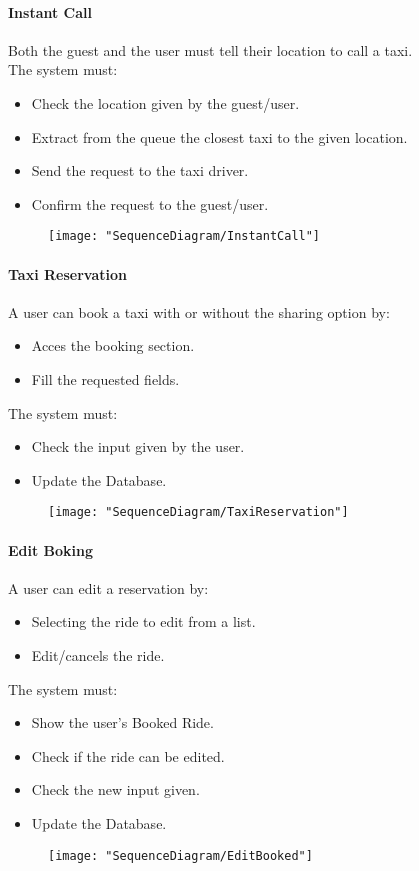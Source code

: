 		\paragraph{Instant Call}
			Both the guest and the user must tell their location to call a taxi.\\
			The system must:\begin{itemize}
				\item Check the location given by the guest/user.
				\item Extract from the queue the closest taxi to the given location.
				\item Send the request to the taxi driver.
				\item Confirm the request to the guest/user.
			\end{itemize}
			\begin{figure}[h!]
				\centering
				\texttt{[image: "SequenceDiagram/InstantCall"]}
			\end{figure}
			\newpage

		\paragraph{Taxi Reservation}
			A user can book a taxi with or without the sharing option by:\begin{itemize}
				\item Acces the booking {section}.
				\item Fill the requested fields.
			\end{itemize}
			The system must:\begin{itemize}
				\item Check the input given by the user.
				\item Update the Database.
			\end{itemize}
			\begin{figure}[h!]
				\centering
				\texttt{[image: "SequenceDiagram/TaxiReservation"]}
			\end{figure}
			\newpage

		\paragraph{Edit Boking}
			A user can edit a reservation by:\begin{itemize}
				\item Selecting the ride to edit from a list.
				\item Edit/cancels the ride.
			\end{itemize}
			The system must:\begin{itemize}
				\item Show the user's Booked Ride.
				\item Check if the ride can be edited.
				\item Check the new input given.
				\item Update the Database.
			\end{itemize}
				\newpage
				\begin{figure}[h!]
					\centering
					\texttt{[image: "SequenceDiagram/EditBooked"]}
				\end{figure}
				\newpage

